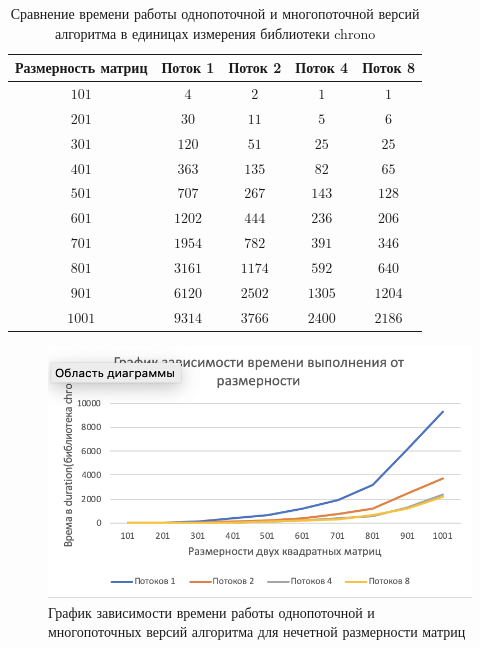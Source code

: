 \documentclass[12pt, a4paper]{report}
\begin{document}
	\newpage

	\begin{table}[ht!]
		\caption{Сравнение времени работы однопоточной и многопоточной версий алгоритма 	в единицах измерения библиотеки chrono}
		\label{table2}
		\begin{center}
			\begin{tabular}{|c|c|c|c|c|}
				\hline
				\bf{Размерность матриц} & \bf{Поток 1} & \bf{Поток 2} & \bf{Поток 4} & \bf{Поток 	8}\\\hline
			
				$101$ & $4$ & $2$ & $1$ & $1$\\\hline
			
				$201$ & $30$ & $11$ & $5$ & $6$\\\hline
			
				$301$ & $120$ & $51$ & $25$ & $25$\\\hline
			
				$401$ & $363$ & $135$ & $82$ & $65$\\\hline
			
				$501$ & $707$ & $267$ & $143$ & $128$\\\hline
			
				$601$ & $1202$ & $444$ & $236$ & $206$\\\hline
			
				$701$ & $1954$ & $782$ & $391$ & $346$\\\hline
			
				$801$ & $3161$ & $1174$ & $592$ & $640$\\\hline
			
				$901$ & $6120$ & $2502$ & $1305$ & $1204$\\\hline
			
				$1001$ & $9314$ & $3766$ & $2400$ & $2186$\\\hline
			\end{tabular}
		\end{center}
	\end{table}

	
	\begin{figure}[ht!]
		\label{pic2}
		\includegraphics[scale=1.2]{table1}
		\caption{График зависимости времени работы однопоточной и многопоточных версий алгоритма для нечетной размерности матриц}
		\label{fig:image}
	\end{figure}
\end{document}
